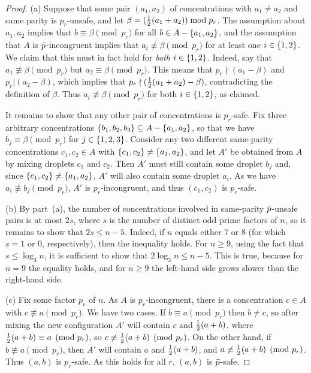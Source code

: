 \begin{proof}
(a)
Suppose that some pair $(a_1,a_2)$ of concentrations with $a_1\neq a_2$ and same parity is $p_r$-unsafe,
and let $\beta = ({\textstyle\frac{1}{2}} (a_1+a_2)) \bmod p_r$. The assumption about $a_1,a_2$ implies that 
$b\equiv \beta \pmod{p_r}$ for all $b\in A- { \left\{ a_1,a_2 \right\} }$, and the assumption that 
$A$ is ${\bar{p}}$-incongruent implies that $a_i \not\equiv \beta \pmod{p_r}$ for at
least one $i\in{ \left\{ 1,2 \right\} }$. We claim that this must in fact hold for
\emph{both} $i\in{ \left\{ 1,2 \right\} }$. Indeed, say that $a_1 \not\equiv \beta \pmod{p_r}$
but $a_2 \equiv \beta \pmod{p_r}$. This means that
$p_r\nmid (a_1-\beta)$ and $p_r| (a_2-\beta)$, which implies that
$p_r\nmid ({\textstyle\frac{1}{2}}(a_1+a_2) - \beta)$, contradicting the definition of $\beta$.
Thus $a_i \not\equiv \beta \pmod{p_r}$ for both $i\in{ \left\{ 1,2 \right\} }$, as claimed.

It remains to show that any other pair of concentrations is $p_r$-safe. 
Fix three arbitrary concentrations ${ \left\{ b_1,b_2,b_3 \right\} }\subseteq A - { \left\{ a_1,a_2 \right\} }$, 
so that we have $b_j\equiv\beta\pmod{p_r}$ for $j\in{ \left\{ 1,2,3 \right\} }$.
Consider any two different same-parity concentrations $c_1,c_2\in A$ with ${ \left\{ c_1,c_2 \right\} }\neq{ \left\{ a_1,a_2 \right\} }$, and
let $A'$ be obtained from $A$ by mixing droplets $c_1$ and $c_2$.
Then $A'$ must still contain some droplet $b_j$ and, since ${ \left\{ c_1,c_2 \right\} }\neq{ \left\{ a_1,a_2 \right\} }$, 
$A'$ will also contain some droplet $a_i$. 
As we have $a_i\not\equiv b_j \pmod{p_r}$, $A'$ is $p_r$-incongruent, 
and thus $(c_1,c_2)$ is $p_r$-safe.
	
(b) By part~(a),
	the	number of concentrations involved in same-parity ${\bar{p}}$-unsafe pairs is at most
	$2s$, where $s$ is the number of distinct odd prime factors of $n$,
	so it remains to show that  $2s \leq n-5$.
	Indeed,	if $n$ equals either $7$ or $8$ (for which $s=1$ or $0$, respectively), then the inequality holds. 
	For $n\ge 9$, using the fact that $s\le \log_3{n}$, it is sufficient to show that
	$2\log_3{n} \le n-5$. This is true, because for $n=9$ the equality holds,
	and for $n\ge 9$ the left-hand side grows slower than the right-hand side.	
	
(c) Fix some factor $p_r$ of $n$. As $A$ is $p_r$-incongruent, there is
a concentration $c\in A$ with $c\not\equiv a \pmod{p_r}$. We have two cases. 
If $b\equiv a\pmod{p_r}$ then $b\neq c$, so after mixing the new configuration
$A'$ will contain $c$ and ${\textstyle\frac{1}{2}}(a+b)$, where ${\textstyle\frac{1}{2}}(a+b) \equiv a \pmod{p_r}$,
so $c\not\equiv {\textstyle\frac{1}{2}}(a+b) \pmod{p_r}$.
On the other hand, if $b\not\equiv a\pmod{p_r}$, then $A'$ will contain $a$ and ${\textstyle\frac{1}{2}}(a+b)$,
and $a\not\equiv {\textstyle\frac{1}{2}}(a+b) \pmod{p_r}$. Thus $(a,b)$ is $p_r$-safe.
As this holds for all $r$, $(a,b)$ is ${\bar{p}}$-safe.
\end{proof}

